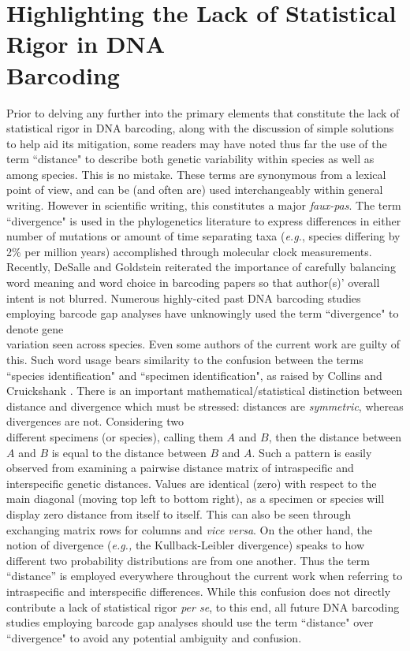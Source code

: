 \section{Highlighting the Lack of Statistical Rigor in DNA \\ Barcoding}

Prior to delving any further into the primary elements that constitute the lack of \\ statistical rigor in DNA barcoding, along with the discussion of simple solutions to help aid its mitigation, some readers may have noted thus far the use of the term ``distance" to describe both genetic variability within species as well as among species. This is no mistake. These terms are synonymous from a lexical point of view, and can be (and often are) used interchangeably within general writing. However in scientific writing, this constitutes a major \textit{faux-pas}. The term ``divergence" is used in the phylogenetics literature to express differences in either number of mutations or amount of time separating taxa (\textit{e.g.}, species differing by 2\% per million years) accomplished through molecular clock measurements. Recently, DeSalle and Goldstein \cite{desalle2019review} reiterated the importance of carefully balancing word meaning and word choice in barcoding papers so that author(s)' overall intent is not blurred. Numerous highly-cited past DNA barcoding studies employing barcode gap analyses have unknowingly used the term ``divergence" to denote gene \\ variation seen across species. Even some authors of the current work are guilty of this. Such word usage bears similarity to the confusion between the terms ``species identification" and ``specimen identification", as raised by Collins and Cruickshank \cite{collins2013seven}. There is an important mathematical/statistical distinction between distance and divergence which must be stressed: distances are \textit{symmetric}, whereas divergences are not. Considering two \\ different specimens (or species), calling them $A$ and $B$, then the distance between $A$ and $B$ is equal to the distance between $B$ and $A$. Such a pattern is easily observed from examining a pairwise distance matrix of intraspecific and interspecific genetic distances. Values are identical (zero) with respect to the main diagonal (moving top left to bottom right), as a specimen or species will display zero distance from itself to itself. This can also be seen through exchanging matrix rows for columns and \textit{vice versa}. On the other hand, the notion of divergence (\textit{e.g.,} the Kullback-Leibler divergence) speaks to how different two probability distributions are from one another. Thus the term ``distance'' is employed everywhere throughout the current work when referring to intraspecific and interspecific differences. While this confusion does not directly contribute a lack of statistical rigor \textit{per se}, to this end, all future DNA barcoding studies employing barcode gap analyses should use the term ``distance" over ``divergence" to avoid any potential ambiguity and confusion.  



